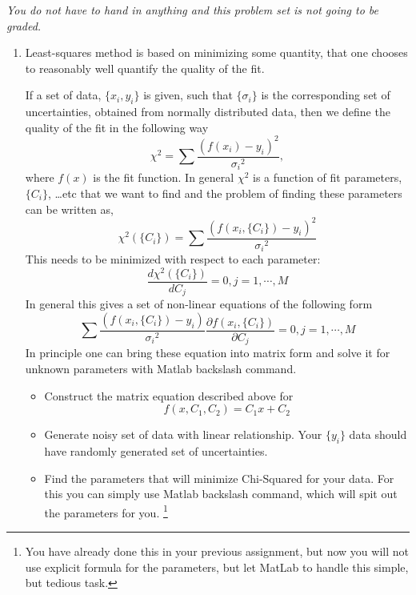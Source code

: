 \documentclass[letterpaper]{article}
\begin{document}
\emph{You do not have to hand in anything and this problem set is not going to be graded.} 
\begin{enumerate}
\item Least-squares method is based on minimizing some quantity, that one chooses to reasonably well quantify the quality of the fit. 

If a set of data, $\{x_i,y_i\}$ is given, such that $\{\sigma_{i}\}$ is the corresponding set of uncertainties, obtained from normally distributed data, then we define the quality of the fit in the following way
\begin{equation*}
\chi^2=\sum{\dfrac{(f(x_i)-y_i)^2}{{\sigma_i}^2}},
\end{equation*}
where $f(x)$ is the fit function.
In general $\chi^2$ is a function of fit parameters, $\{C_i\}$, \dots etc that we want to find and the problem of finding these parameters can be written as,
\begin{equation*}
\chi^2(\{C_i\})=\sum{\dfrac{(f(x_i, \{C_i\})-y_i)^2}{{\sigma_i}^2}}
\end{equation*}
This needs to be minimized with respect to each parameter:
\begin{equation*}
\dfrac{d \chi^2(\{C_i\})}{d C_j}=0, j=1,\cdots, M
\end{equation*}
In general this gives a set of non-linear equations of the following form
\begin{equation*}
\sum{\dfrac{(f(x_i, \{C_i\})-y_i)}{{\sigma_i}^2}} \dfrac{\partial f(x_i,\{C_i\})}{\partial C_j}=0 , j=1,\cdots,M
\end{equation*}
In principle one can bring these equation into matrix form and solve it for unknown parameters with Matlab backslash command.
\begin{itemize}
\item Construct the matrix equation described above for 
\begin{equation*}
f(x,C_1,C_2)=C_1 x+C_2
\end{equation*}
\item Generate noisy set of data with linear relationship. Your $\{y_i\}$ data should have randomly generated set of uncertainties.
\item Find the parameters that will minimize Chi-Squared for your data. For this you can simply use Matlab backslash command, which will spit out the parameters for you. \footnote{You have already done this in your previous assignment, but now you will not use explicit formula for the parameters, but let MatLab to handle this simple, but tedious task.}

\end{itemize}
\end{enumerate}
\end{document}

